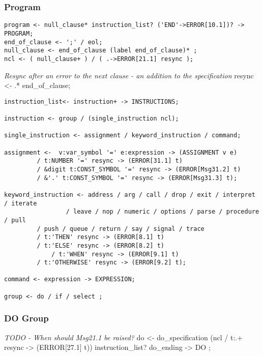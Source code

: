 \subsubsection{Program}

\begin{verbatim}
program <- null_clause* instruction_list? ('END'->ERROR[10.1])? -> PROGRAM;
end_of_clause <- ';' / eol;
null_clause <- end_of_clause (label end_of_clause)* ;
ncl <- ( null_clause+ ) / ( .->ERROR[21.1] resync ); 
\end{verbatim}

\emph{Resync after an error to the next clause - an addition to the specification}
resync \textless{}- .* end\_of\_clause;

\begin{verbatim}
instruction_list<- instruction+ -> INSTRUCTIONS;

instruction <- group / (single_instruction ncl);

single_instruction <- assignment / keyword_instruction / command;

assignment <-  v:var_symbol '=' e:expression -> (ASSIGNMENT v e)
         / t:NUMBER '=' resync -> (ERROR[31.1] t) 
		 / &digit t:CONST_SYMBOL '=' resync -> (ERROR[Msg31.2] t)
		 / &'.' t:CONST_SYMBOL '=' resync -> (ERROR[Msg31.3] t);

keyword_instruction <- address / arg / call / drop / exit / interpret / iterate 
                 / leave / nop / numeric / options / parse / procedure / pull 
	     / push / queue / return / say / signal / trace 
	     / t:'THEN' resync -> (ERROR[8.1] t) 
	     / t:'ELSE' resync -> (ERROR[8.2] t) 
    	     / t:'WHEN' resync -> (ERROR[9.1] t)
	     / t:'OTHERWISE' resync -> (ERROR[9.2] t);

command <- expression -> EXPRESSION;

group <- do / if / select ; 
\end{verbatim}

\subsubsection{DO Group}

\emph{TODO - When should Msg21.1 be raised?}
do \textless{}- do\_specification (ncl / t:.+ resync -\textgreater{} (ERROR{[}27.1{]} t)) instruction\_list? do\_ending -\textgreater{} DO ;

